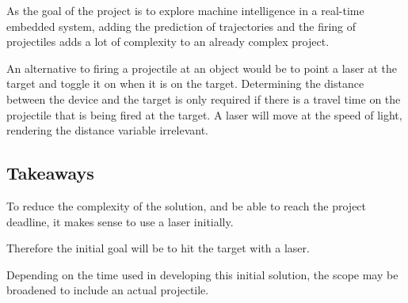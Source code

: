 As the goal of the project is to explore machine intelligence in a real-time embedded system, adding the prediction of trajectories and the firing of projectiles adds a lot of complexity to an already complex project.

An alternative to firing a projectile at an object would be to point a laser at the target and toggle it on when it is on the target.
Determining the distance between the device and the target is only required if there is a travel time on the projectile that is being fired at the target.
A laser will move at the speed of light, rendering the distance variable irrelevant.


\subsection{Takeaways}\label{anal:laser:takeaway}
To reduce the complexity of the solution, and be able to reach the project deadline, it makes sense to use a laser initially.

Therefore the initial goal will be to hit the target with a laser.

Depending on the time used in developing this initial solution, the scope may be broadened to include an actual projectile.
